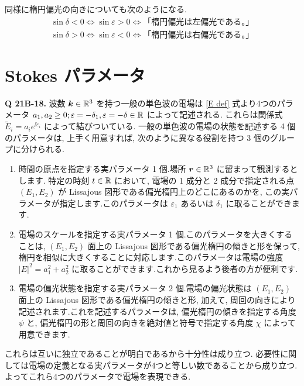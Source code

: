 \documentclass[uplatex,a4paper,dvipdfmx]{jsarticle}
\theoremstyle{definition}
\begin{document}
同様に楕円偏光の向きについても次のようになる.
\begin{align}
  \sin\delta < 0 \iff \sin\varepsilon > 0 \iff \textrm{「楕円偏光は左偏光である。」} \\
  \sin\delta > 0 \iff \sin\varepsilon < 0 \iff \textrm{「楕円偏光は右偏光である。」}
\end{align}

\section{Stokes パラメータ}
\textbf{Q 21B-18.}
波数 $\vb*{k}\in\mathbb{R}^3$ を持つ一般の単色波の電場は \eqref{E def} 式より4つのパラメータ $a_1, a_2 \geq 0; \varepsilon = -\delta_1, \varepsilon = -\delta\in\mathbb{R}$ によって記述される. これらは関係式 $\tilde{E}_i = a_ie^{\ii \varepsilon_i}$ によって結びついている. 一般の単色波の電場の状態を記述する 4 個のパラメータは, 上手く用意すれば, 次のように異なる役割を持つ 3 個のグループに分けられる.

\begin{enumerate}
  \item 時間の原点を指定する実パラメータ 1 個.場所 $\vb*{r}\in\mathbb{R}^3$ に留まって観測するとします. 特定の時刻 $t\in\mathbb{R}$ において, 電場の 1 成分と 2 成分で指定される点 $(E_1, E_2)$ が Lissajous 図形である偏光楕円上のどこにあるのかを, この実パラメータが指定します.このパラメータは $\varepsilon_1$ あるいは $\delta_1$ に取ることができます.
  \item 電場のスケールを指定する実パラメータ 1 個.このパラメータを大きくすることは, $(E_1, E_2)$ 面上の Lissajous 図形である偏光楕円の傾きと形を保って, 楕円を相似に大きくすることに対応します.このパラメータは電場の強度 $|E|^2 = a_1^2 + a_2^2$ に取ることができます.これから見るよう後者の方が便利です.
  \item 電場の偏光状態を指定する実パラメータ 2 個.電場の偏光状態は $(E_1, E_2)$ 面上の Lissajous 図形である偏光楕円の傾きと形, 加えて, 周回の向きにより記述されます.これを記述するパラメータは, 偏光楕円の傾きを指定する角度 $\psi$ と, 偏光楕円の形と周回の向きを絶対値と符号で指定する角度 $\chi$ によって用意できます.
\end{enumerate}

これらは互いに独立であることが明白であるから十分性は成り立つ. 必要性に関しては電場の定義となる実パラメータが4つと等しい数であることから成り立つ. よってこれら4つのパラメータで電場を表現できる.
\end{document}
